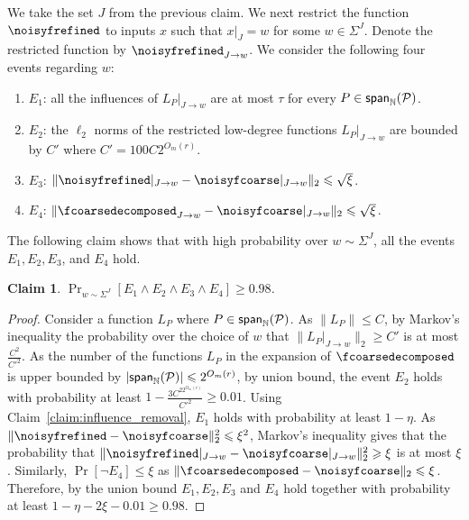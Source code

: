\documentclass[11pt]{article}
\newtheorem{claim}[thm]{Claim}
\newcommand\spn{{\sf span}_{\mathbb{N}}}
\renewcommand\geq{\geqslant}
\renewcommand\leq{\leqslant}
\newcommand{\V}[1]{{#1}}
\begin{document}
We take the set $J$ from the previous claim. We next restrict the function $\noisyfrefined$ to inputs $\V x$ such that $\V x|_{J} = \V w$ for some $\V w\in \Sigma^J$. Denote the restricted function by $\noisyfrefined_{J\rightarrow \V w}$. We consider the following four events regarding $w$:
\begin{enumerate}
    \item $E_1$: all the influences of $L_P|_{J\rightarrow \V w}$ are at most $\tau$ for every $P\in \spn(\mathcal{P})$.
    \item $E_2$: the $\ell_2$ norms of the restricted low-degree functions $L_P|_{J\rightarrow \V w}$ are bounded by $C'$ where $C' = 100C2^{O_m(r)}$.
    \item $E_3$: $\|\noisyfrefined|_{J\rightarrow \V w} - \noisyfcoarse|_{J\rightarrow \V w}\|_2 \leq \sqrt{\xi}$.
    \item $E_4$:  $\|\fcoarsedecomposed_{J\rightarrow \V w}  - \noisyfcoarse|_{J\rightarrow \V w}\|_2 \leq \sqrt{\xi}$.
\end{enumerate}
The following claim shows that with high probability over $\V w\sim \Sigma^J$, all the events $E_1, E_2, E_3$, and $E_4$ hold.
\begin{claim}\label{claim:goodevents}
    $\Pr_{\V w\sim \Sigma^J}\left[E_1 \wedge E_2 \wedge E_3\wedge E_4\right]\geq 0.98$.
\end{claim}
\begin{proof}
    Consider a function $L_P$ where $P\in \spn(\mathcal{P})$. As $\|L_P\|\leq C$, by Markov's inequality the probability over the choice of $w$ that $\|L_P|_{J\rightarrow \V w}\|_2\geq C'$ is at most $\frac{C^2}{C'^2}$. As the number of the functions $L_P$ in the expansion of $\fcoarsedecomposed$ is upper bounded by $|\spn(\mathcal{P})|\leq 2^{O_m(r
    )}$, 
    by union bound, the event $E_2$ holds with probability at least $1-\frac{3C^22^{O_m(r)}}{C'^2}\geq 0.01$. Using Claim~\ref{claim:influence_removal}, $E_1$ holds with probability at least $1-
    \eta$.
    As $\|\noisyfrefined-\noisyfcoarse\|_2^2\leq \xi^2$, Markov's inequality gives that the probability that $\|\noisyfrefined|_{J\rightarrow \V w} - \noisyfcoarse|_{J\rightarrow \V w}\|_2^2\geq \xi$ is at most $\xi$. Similarly, $\Pr[\neg E_4]\leq \xi$ as  $\|\fcoarsedecomposed  - \noisyfcoarse\|_2 \leq \xi$. Therefore, by the union bound $E_1, E_2, E_3$ and $E_4$ hold together with probability at least $1-\eta-2\xi -0.01\geq 0.98$. 
    \end{proof}
\end{document}
